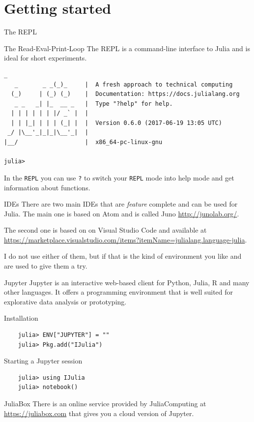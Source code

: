 \documentclass{beamer}
\begin{document}
\section{Getting started}
\begin{frame}[fragile]{The REPL}
  \begin{block}{The Read-Eval-Print-Loop}
    The REPL is a command-line interface to Julia and is ideal for short experiments.
    \begin{Verbatim}[fontsize=\footnotesize]
               _
   _       _ _(_)_     |  A fresh approach to technical computing
  (_)     | (_) (_)    |  Documentation: https://docs.julialang.org
   _ _   _| |_  __ _   |  Type "?help" for help.
  | | | | | | |/ _` |  |
  | | |_| | | | (_| |  |  Version 0.6.0 (2017-06-19 13:05 UTC)
 _/ |\__'_|_|_|\__'_|  |  
|__/                   |  x86_64-pc-linux-gnu

julia> 

\end{Verbatim}

In the \verb|REPL| you can use \verb|?| to switch your \verb|REPL| mode into help mode and get information about functions.
  \end{block}
\end{frame}
\begin{frame}{IDEs}
  There are two main IDEs that are \emph{feature} complete and can be used for Julia. The main one is based on Atom and is called Juno \url{http://junolab.org/}.

  The second one is based on on Visual Studio Code and available at \url{https://marketplace.visualstudio.com/items?itemName=julialang.language-julia}.

  I do not use either of them, but if that is the kind of environment you like and are used to give them a try.
\end{frame}
\begin{frame}[fragile]{Jupyter}
  Jupyter is an interactive web-based client for Python, Julia, R and many other languages.
  It offers a programming environment that is well suited for explorative data analysis or prototyping.
  \begin{block}{Installation}
  \begin{Verbatim}
    julia> ENV["JUPYTER"] = ""
    julia> Pkg.add("IJulia")
    \end{Verbatim}
  \end{block}
  \begin{block}{Starting a Jupyter session}
    \begin{Verbatim}
    julia> using IJulia
    julia> notebook()
    \end{Verbatim}
  \end{block}
  \begin{block}{JuliaBox}
    There is an online service provided by JuliaComputing at \url{https://juliabox.com} that gives you a cloud version of Jupyter.
  \end{block}
\end{frame}
\end{document}
